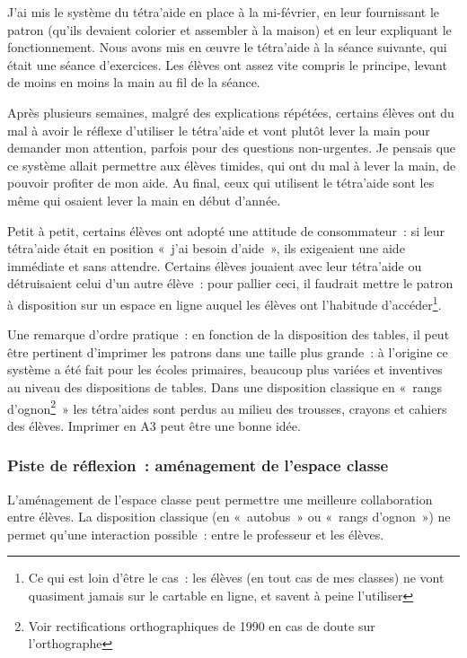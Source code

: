 J'ai mis le système du tétra'aide en place à la mi-février, en leur fournissant
le patron (qu'ils devaient colorier et assembler à la maison) et en leur expliquant
le fonctionnement. Nous avons mis en œuvre le tétra'aide à la séance suivante,
qui était une séance d'exercices. Les élèves ont assez vite compris le principe,
levant de moins en moins la main au fil de la séance.

Après plusieurs semaines, malgré des explications répétées, certains élèves ont du mal à avoir le réflexe
d'utiliser le tétra'aide et vont plutôt lever la main pour demander mon attention,
parfois pour des questions non-urgentes. Je pensais que ce système allait permettre
aux élèves timides, qui ont du mal à lever la main, de pouvoir profiter de mon aide.
Au final, ceux qui utilisent le tétra'aide sont les même qui osaient lever la main
en début d'année.

Petit à petit, certains élèves ont adopté une attitude de consommateur : si
leur tétra'aide était en position « j'ai besoin d'aide », ils exigeaient une
aide immédiate et sans attendre. Certains élèves jouaient avec leur tétra'aide ou
détruisaient celui d'un autre élève : pour pallier ceci, il faudrait mettre
le patron à disposition sur un espace en ligne auquel les élèves ont l'habitude
d'accéder\footnote{Ce qui est loin d'être le cas : les élèves (en tout cas de mes
classes) ne vont quasiment jamais sur le cartable en ligne, et savent à peine
l'utiliser}.

Une remarque d'ordre pratique : en fonction de la disposition des tables, il
peut être pertinent d'imprimer les patrons dans une taille plus grande : à
l'origine ce système a été fait pour les écoles primaires, beaucoup plus variées
et inventives au niveau des dispositions de tables. Dans une disposition classique
en « rangs d'ognon\footnote{Voir rectifications orthographiques de 1990 en cas de doute
sur l'orthographe} » les tétra'aides sont perdus au milieu des trousses, crayons
et cahiers des élèves. Imprimer en A3 peut être une bonne idée.

\subsubsection{Piste de réflexion : aménagement de l'espace classe}

L'aménagement de l'espace classe peut permettre une meilleure collaboration entre
élèves. La disposition classique (en « autobus » ou « rangs d'ognon ») ne permet
qu'une interaction possible : entre le professeur et les élèves.

